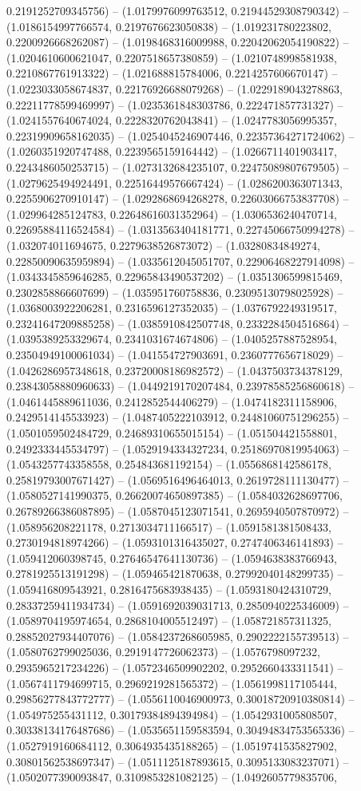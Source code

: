 0.2191252709345756) -- (1.0179976099763512, 0.21944529308790342) -- (1.0186154997766574, 0.2197676623050838) -- (1.019231780223802, 0.2200926668262087) -- (1.0198468316009988, 0.22042062054190822) -- (1.0204610600621047, 0.2207518657380859) -- (1.0210748998581938, 0.2210867761913322) -- (1.021688815784006, 0.2214257606670147) -- (1.0223033058674837, 0.22176926688079268) -- (1.0229189043278863, 0.22211778599469997) -- (1.0235361848303786, 0.222471857731327) -- (1.0241557640674024, 0.2228320762043841) -- (1.0247783056995357, 0.22319909658162035) -- (1.0254045246907446, 0.22357364271724062) -- (1.0260351920747488, 0.2239565159164442) -- (1.0266711401903417, 0.2243486050253715) -- (1.0273132684235107, 0.22475089807679505) -- (1.0279625494924491, 0.22516449576667424) -- (1.0286200363071343, 0.2255906270910147) -- (1.0292868694268278, 0.22603066753837708) -- (1.029964285124783, 0.22648616031352964) -- (1.0306536240470714, 0.22695884116524584) -- (1.0313563404181771, 0.22745066750994278) -- (1.032074011694675, 0.2279638526873072) -- (1.03280834849274, 0.22850090635959894) -- (1.0335612045051707, 0.22906468227914098) -- (1.0343345859646285, 0.22965843490537202) -- (1.0351306599815469, 0.2302858866607699) -- (1.035951760758836, 0.23095130798025928) -- (1.0368003922206281, 0.2316596127352035) -- (1.0376792249319517, 0.23241647209885258) -- (1.0385910842507748, 0.2332284504516864) -- (1.0395389253329674, 0.2341031674674806) -- (1.0405257887528954, 0.23504949100061034) -- (1.041554727903691, 0.2360777656718029) -- (1.0426286957348618, 0.23720008186982572) -- (1.0437503734378129, 0.23843058880960633) -- (1.0449219170207484, 0.23978585256860618) -- (1.0461445889611036, 0.2412852544406279) -- (1.0474182311158906, 0.2429514145533923) -- (1.0487405222103912, 0.24481060751296255) -- (1.0501059502484729, 0.24689310655015154) -- (1.051504421558801, 0.2492333445534797) -- (1.0529194334327234, 0.25186970819954063) -- (1.0543257743358558, 0.254843681192154) -- (1.0556868142586178, 0.25819793007671427) -- (1.0569516496464013, 0.2619728111130477) -- (1.0580527141990375, 0.26620074650897385) -- (1.0584032628697706, 0.26789266386087895) -- (1.0587045123071541, 0.2695940507870972) -- (1.058956208221178, 0.2713034711166517) -- (1.0591581381508433, 0.2730194818974266) -- (1.0593101316435027, 0.2747406346141893) -- (1.059412060398745, 0.27646547641130736) -- (1.0594638383766943, 0.2781925513191298) -- (1.059465421870638, 0.27992040148299735) -- (1.059416809543921, 0.2816475683938435) -- (1.0593180424310729, 0.28337259411934734) -- (1.0591692039031713, 0.2850940225346009) -- (1.0589704195974654, 0.2868104005512497) -- (1.058721857311325, 0.28852027934407076) -- (1.0584237268605985, 0.2902222155739513) -- (1.0580762799025036, 0.2919147726062373) -- (1.0576798097232, 0.2935965217234226) -- (1.0572346509902202, 0.2952660433311541) -- (1.0567411794699715, 0.2969219281565372) -- (1.0561998117105444, 0.29856277843772777) -- (1.0556110046900973, 0.30018720910380814) -- (1.054975255431112, 0.30179384894394984) -- (1.0542931005808507, 0.30338134176487686) -- (1.0535651159583594, 0.30494834753565336) -- (1.0527919160684112, 0.3064935435188265) -- (1.0519741535827902, 0.30801562538697347) -- (1.0511125187893615, 0.3095133083237071) -- (1.0502077390093847, 0.3109853281082125) -- (1.0492605779835706, 